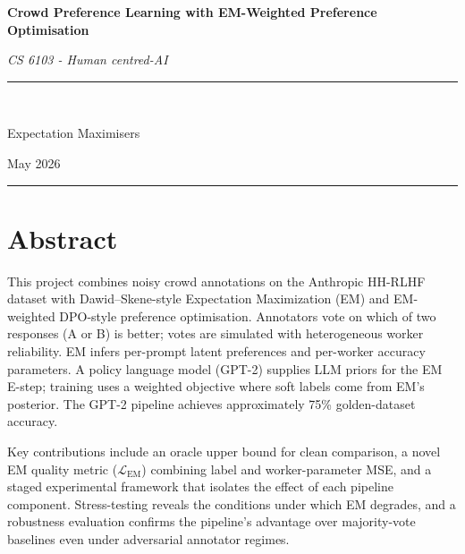 \documentclass[11pt, a4paper]{article}
\begin{document}
\begin{titlepage}
  \centering
  \vspace*{3cm}
  {\Huge\bfseries\color{codeblue} Crowd Preference Learning with EM-Weighted Preference Optimisation \par}
  \vspace{0.6cm}
  {\large\itshape CS 6103 - Human centred-AI \par}
  \vspace{1.5cm}
  \rule{\linewidth}{0.4pt}\\[0.4cm]
  {\large Expectation Maximisers \par}
  \vspace{0.4cm}
  \vspace{0.2cm}
  \vspace{0.2cm}
  {\large May 2026 \par}
  \vspace{1cm}
  \rule{\linewidth}{0.4pt}
\end{titlepage}

\tableofcontents
\newpage

\section{Abstract}

This project combines noisy crowd annotations on the Anthropic HH-RLHF dataset with
Dawid--Skene-style Expectation Maximization (EM) and EM-weighted DPO-style preference
optimisation. Annotators vote on which of two responses (A or B) is better; votes are
simulated with heterogeneous worker reliability. EM infers per-prompt latent preferences
and per-worker accuracy parameters. A policy language model (GPT-2) supplies LLM priors
for the EM E-step; training uses a weighted objective where soft labels come from EM's
posterior. The GPT-2 pipeline achieves approximately 75\% golden-dataset accuracy.

Key contributions include an oracle upper bound for clean comparison, a novel EM quality
metric ($\mathcal{L}_\text{EM}$) combining label and worker-parameter MSE, and a staged
experimental framework that isolates the effect of each pipeline component. Stress-testing
reveals the conditions under which EM degrades, and a robustness evaluation confirms the
pipeline's advantage over majority-vote baselines even under adversarial annotator regimes.
\end{document}
